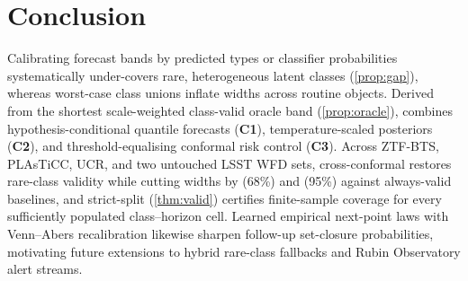 \section{Conclusion}
\label{sec:conclusion}

Calibrating forecast bands by predicted types or classifier probabilities systematically under-covers rare, heterogeneous latent classes (\cref{prop:gap}), whereas worst-case class unions inflate widths across routine objects.
Derived from the shortest scale-weighted class-valid oracle band (\cref{prop:oracle}), \gamut{} combines hypothesis-conditional quantile forecasts (\textbf{C1}), temperature-scaled posteriors (\textbf{C2}), and threshold-equalising conformal risk control (\textbf{C3}).
Across ZTF-BTS, PLAsTiCC, UCR, and two untouched LSST WFD sets, cross-conformal \gamut{} restores rare-class validity while cutting widths by \WidthGainValidSixtyeight{} (68\%) and \WidthGainValidNinetyfive{} (95\%) against always-valid baselines, and strict-split \gamut{} (\cref{thm:valid}) certifies finite-sample coverage for every sufficiently populated class--horizon cell.
Learned empirical next-point laws with Venn--Abers recalibration likewise sharpen follow-up set-closure probabilities, motivating future extensions to hybrid rare-class fallbacks and Rubin Observatory alert streams.
